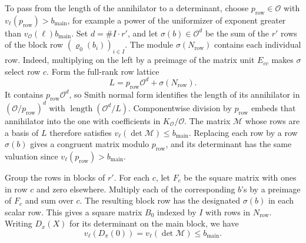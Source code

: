 To pass from the length of the annihilator to a determinant,
choose \(p_{\mathrm{row}}\in\mathcal O\) with \(v_\ell(p_{\mathrm{row}})>b_{\mathrm{main}}\), for example a
power of the uniformizer of exponent greater than \(v_{\mathcal O}(\ell)b_{\mathrm{main}}\).
Set \(d=\#I\cdot r'\), and let \(\sigma(b)\in\mathcal O^d\)
be the sum of the \(r'\) rows of the block row \((\varrho_0(b_i))_{i\in I}\).
The module \(\sigma(N_\mathrm{row})\) contains each individual row.
Indeed, multiplying on the left by a preimage of the matrix unit
\(E_{cc}\) makes \(\sigma\) select row \(c\). Form the full-rank row lattice
\[
 L=p_{\mathrm{row}}\mathcal O^d+\sigma(N_\mathrm{row}).
\]
It contains \(p_{\mathrm{row}}\mathcal O^d\), so Smith normal form identifies the
length of its annihilator in \((\mathcal O/p_{\mathrm{row}})^d\) with
\(\operatorname{length}(\mathcal O^d/L)\). Componentwise division
by \(p_{\mathrm{row}}\) embeds that annihilator into the one with coefficients
in \(K_{\mathcal O}/\mathcal O\). The matrix \(\mathcal M\) whose
rows are a basis of \(L\) therefore satisfies
\(v_\ell(\det\mathcal M)\le b_{\mathrm{main}}\). Replacing each row by a row
\(\sigma(b)\) gives a congruent matrix modulo \(p_{\mathrm{row}}\), and its
determinant has the same valuation since \(v_\ell(p_{\mathrm{row}})>b_{\mathrm{main}}\).

Group the rows in blocks of \(r'\). For each \(c\), let \(F_c\) be
the square matrix with ones in row \(c\) and zero elsewhere.
Multiply each of the corresponding \(b\)'s by a preimage of \(F_c\)
and sum over \(c\). The resulting block row has the designated
\(\sigma(b)\) in each scalar row. This gives a square matrix \(B_0\)
indexed by \(I\) with rows in \(N_\mathrm{row}\). Writing \(D_x(X)\)
for its determinant on the main block, we have
\begingroup{}
\[
 v_\ell(D_\pi(0))=v_\ell(\det\mathcal M)\le b_{\mathrm{main}} .
\]
\endgroup
